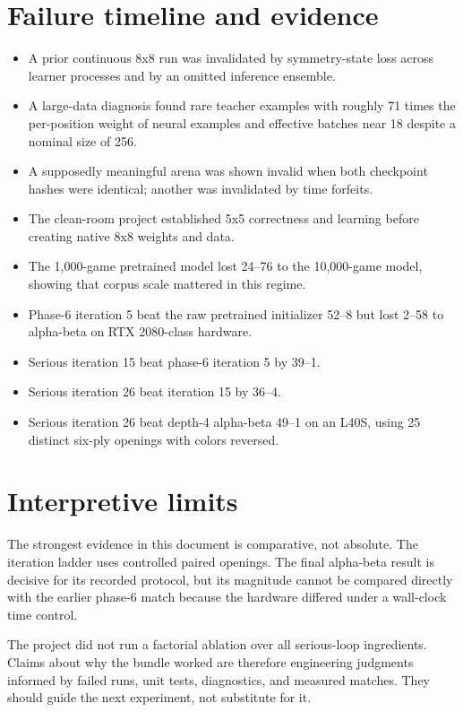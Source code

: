 \documentclass[10.5pt,letterpaper]{article}
\begin{document}
\section{Failure timeline and evidence}
\begin{itemize}
  \item A prior continuous 8x8 run was invalidated by symmetry-state loss across
        learner processes and by an omitted inference ensemble.
  \item A large-data diagnosis found rare teacher examples with roughly 71 times
        the per-position weight of neural examples and effective batches near
        18 despite a nominal size of 256.
  \item A supposedly meaningful arena was shown invalid when both checkpoint
        hashes were identical; another was invalidated by time forfeits.
  \item The clean-room project established 5x5 correctness and learning before
        creating native 8x8 weights and data.
  \item The 1,000-game pretrained model lost 24--76 to the 10,000-game model,
        showing that corpus scale mattered in this regime.
  \item Phase-6 iteration 5 beat the raw pretrained initializer 52--8 but lost
        2--58 to alpha-beta on RTX 2080-class hardware.
  \item Serious iteration 15 beat phase-6 iteration 5 by 39--1.
  \item Serious iteration 26 beat iteration 15 by 36--4.
  \item Serious iteration 26 beat depth-4 alpha-beta 49--1 on an L40S, using 25
        distinct six-ply openings with colors reversed.
\end{itemize}

\section{Interpretive limits}

The strongest evidence in this document is comparative, not absolute. The
iteration ladder uses controlled paired openings. The final alpha-beta result
is decisive for its recorded protocol, but its magnitude cannot be compared
directly with the earlier phase-6 match because the hardware differed under a
wall-clock time control.

The project did not run a factorial ablation over all serious-loop ingredients.
Claims about why the bundle worked are therefore engineering judgments informed
by failed runs, unit tests, diagnostics, and measured matches. They should guide
the next experiment, not substitute for it.
\end{document}
